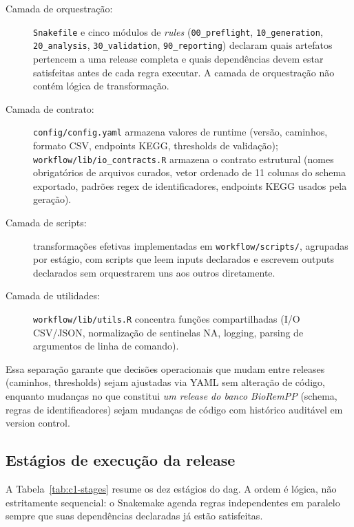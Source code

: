 \begin{description}
    \item[Camada de orquestração:] \texttt{Snakefile} e cinco módulos de \textit{rules} (\texttt{00\_preflight}, \texttt{10\_generation}, \texttt{20\_analysis}, \texttt{30\_validation}, \texttt{90\_reporting}) declaram quais artefatos pertencem a uma release completa e quais dependências devem estar satisfeitas antes de cada regra executar. A camada de orquestração não contém lógica de transformação.
    \item[Camada de contrato:] \texttt{config/config.yaml} armazena valores de runtime (versão, caminhos, formato CSV, endpoints KEGG, thresholds de validação); \texttt{workflow/lib/io\_contracts.R} armazena o contrato estrutural (nomes obrigatórios de arquivos curados, vetor ordenado de 11 colunas do schema exportado, padrões regex de identificadores, endpoints KEGG usados pela geração).
    \item[Camada de scripts:] transformações efetivas implementadas em \texttt{workflow/scripts/}, agrupadas por estágio, com scripts que leem inputs declarados e escrevem outputs declarados sem orquestrarem uns aos outros diretamente.
    \item[Camada de utilidades:] \texttt{workflow/lib/utils.R} concentra funções compartilhadas (I/O CSV/JSON, normalização de sentinelas NA, logging, parsing de argumentos de linha de comando).
\end{description}

Essa separação garante que decisões operacionais que mudam entre releases (caminhos, thresholds) sejam ajustadas via YAML sem alteração de código, enquanto mudanças no que constitui \textit{um release do banco BioRemPP} (schema, regras de identificadores) sejam mudanças de código com histórico auditável em version control.

\subsection{Estágios de execução da release}

A Tabela~\ref{tab:c1-stages} resume os dez estágios do \gls{dag}. A ordem é lógica, não estritamente sequencial: o Snakemake agenda regras independentes em paralelo sempre que suas dependências declaradas já estão satisfeitas.

